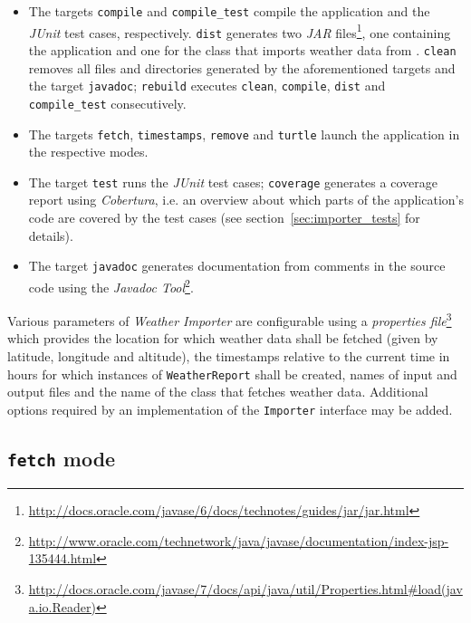 \begin{itemize}
  \item The targets \texttt{compile} and \texttt{compile\_test} compile the application and the \emph{JUnit} test cases, respectively. \texttt{dist} generates two \emph{JAR} files\footnote{\href{http://docs.oracle.com/javase/6/docs/technotes/guides/jar/jar.html}{http://docs.oracle.com/javase/6/docs/technotes/guides/jar/jar.html}}, one containing the application and one for the class that imports weather data from \yrno. \texttt{clean} removes all files and directories generated by the aforementioned targets and the target \texttt{javadoc}; \texttt{rebuild} executes \texttt{clean}, \texttt{compile}, \texttt{dist} and \texttt{compile\_test} consecutively.
  \item The targets \texttt{fetch}, \texttt{timestamps}, \texttt{remove} and \texttt{turtle} launch the application in the respective modes.
  \item The target \texttt{test} runs the \emph{JUnit} test cases; \texttt{coverage} generates a coverage report using \emph{Cobertura}, i.e. an overview about which parts of the application's code are covered by the test cases (see section~\ref{sec:importer_tests} for details).
  \item The target \texttt{javadoc} generates documentation from comments in the source code using the \emph{Javadoc Tool}\footnote{\href{http://www.oracle.com/technetwork/java/javase/documentation/index-jsp-135444.html}{http://www.oracle.com/technetwork/java/javase/documentation/index-jsp-135444.html}}.
\end{itemize}

Various parameters of \emph{Weather Importer} are configurable using a \emph{properties file}\footnote{\href{http://docs.oracle.com/javase/7/docs/api/java/util/Properties.html\#load(java.io.Reader)}{http://docs.oracle.com/javase/7/docs/api/java/util/Properties.html\#load(java.io.Reader)}} which provides the location for which weather data shall be fetched (given by latitude, longitude and altitude), the timestamps relative to the current time in hours for which instances of \texttt{WeatherReport} shall be created, names of input and output files and the name of the class that fetches weather data. Additional options required by an implementation of the \texttt{Importer} interface may be added.

\subsection{\texttt{fetch} mode}
\label{subsec:importer_fetch}

